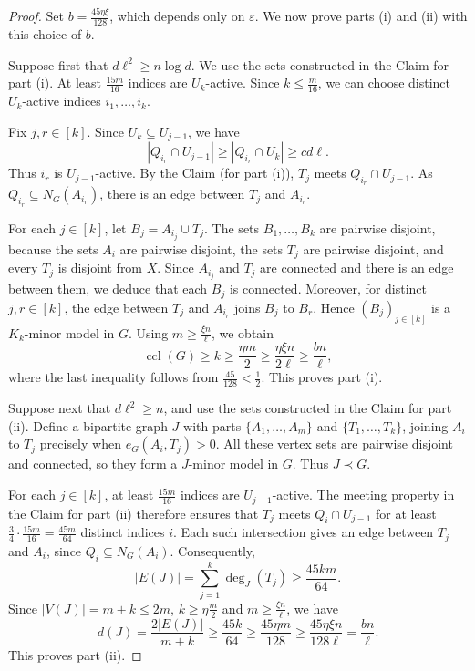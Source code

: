 \documentclass[11pt,a4paper]{article}
\theoremstyle{definition}
\theoremstyle{remark}
\DeclareMathOperator{\ccl}{ccl}
\newcommand{\eps}{\varepsilon}
\begin{document}
\begin{proof}
Set $b=\frac{45\eta\xi}{128}$, which depends only on $\eps$.
We now prove parts (i) and (ii) with this choice of $b$.

Suppose first that $d\ell^2\ge n\log d$.  We use the sets constructed
in the  Claim for part (i). At least $\frac{15m}{16}$ indices are
$U_k$-active.  Since  $k\le\frac{m}{16}$, we can choose distinct
$U_k$-active indices $i_1,\ldots,i_k$.

Fix $j,r\in[k]$. Since $U_k\subseteq U_{j-1}$, we have
\[
 |Q_{i_r}\cap U_{j-1}|
 \ge |Q_{i_r}\cap U_k|
 \ge cd\ell.
\]
Thus $i_r$ is $U_{j-1}$-active. By the 
Claim (for part (i)), $T_j$ meets $Q_{i_r}\cap U_{j-1}$.
As $Q_{i_r}\subseteq N_G(A_{i_r})$, there is an edge between
$T_j$ and $A_{i_r}$.

For each $j\in[k]$, let $B_j=A_{i_j}\cup T_j$.
The sets $B_1,\ldots,B_k$ are pairwise disjoint, because the
sets $A_i$ are pairwise disjoint, the sets $T_j$ are pairwise
disjoint, and every $T_j$ is disjoint from $X$.
Since $A_{i_j}$ and $T_j$ are connected
and there is an edge between them, we deduce that each $B_j$ is connected. Moreover, for distinct
$j,r\in[k]$, the edge between $T_j$ and $A_{i_r}$ joins $B_j$
to $B_r$. Hence $(B_j)_{j\in[k]}$ is a $K_k$-minor model in $G$.
Using $m\ge\frac{\xi n}{\ell}$,
we obtain
\[
 \ccl(G)\ge k
 \ge\frac{\eta m}{2}
 \ge\frac{\eta\xi n}{2\ell}
 \ge\frac{bn}{\ell},
\]
where the last inequality follows from $\frac{45}{128}<\frac12$.
This proves part (i).

Suppose next that $d\ell^2\ge n$, and use the sets constructed in the
Claim for part (ii). Define a bipartite graph $J$ with parts
$\{A_1,\ldots,A_m\}$ and $\{T_1,\ldots,T_k\}$, joining $A_i$
to $T_j$ precisely when $e_G(A_i,T_j)>0$.
All these vertex sets are pairwise disjoint and connected, so
they form a $J$-minor model in $G$. Thus $J\prec G$.

For each $j\in[k]$, at least $\frac{15m}{16}$ indices are
$U_{j-1}$-active. The meeting property in the Claim for part (ii)
therefore ensures that $T_j$ meets $Q_i\cap U_{j-1}$ for at least
$\frac34\cdot\frac{15m}{16}=\frac{45m}{64}$ distinct indices $i$.
Each such intersection gives an edge between $T_j$ and $A_i$,
since $Q_i\subseteq N_G(A_i)$. Consequently,
\[
 |E(J)|=\sum_{j=1}^k\deg_J(T_j)
 \ge\frac{45km}{64}.
\]
Since $|V(J)|=m+k\le2m$, $k\ge \eta \frac{m}{2}$ and $m\ge \frac{\xi n}{\ell}$, we have
\[
 \overline d(J)
 =\frac{2|E(J)|}{m+k}
 \ge\frac{45k}{64}
 \ge\frac{45\eta m}{128}
 \ge\frac{45\eta\xi n}{128\ell}
 =\frac{bn}{\ell}.
\]
This proves part (ii).
\end{proof}
\end{document}
